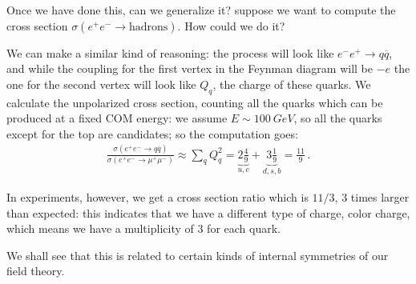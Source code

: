 \documentclass[main.tex]{subfiles}
\begin{document}
Once we have done this, can we generalize it? suppose we want to compute the cross section \(\sigma (e^{+}e^{-} \to \text{hadrons})\). How could we do it?

We can make a similar kind of reasoning: the process will look like \(e^{-} e^{+} \to q \overline{q}\), and while the coupling for the first vertex in the Feynman diagram will be \(-e\) the one for the second vertex will look like \(Q_q\), the charge of these quarks.
We calculate the unpolarized cross section, counting all the quarks which can be produced at a fixed COM energy: we assume \(E \sim \SI{100}{GeV}\), so all the quarks except for the top are candidates; so the computation goes: 
%
\begin{align}
\frac{\sigma (e^{+} e^{-} \to q \overline{q})}{\sigma (e^{+ }e^{-} \to \mu^+ \mu^-)} \approx \sum _{q} Q_q^2 = \underbrace{2 \frac{4}{9} }_{u, c} + \underbrace{3 \frac{1}{9}}_{d, s, b}
= \frac{11}{9}
\,.
\end{align}

In experiments, however, we get a cross section ratio which is \(11/3\), 3 times larger than expected: this indicates that we have a different type of charge, color charge, which means we have a multiplicity of \(3\) for each quark. 

We shall see that this is related to certain kinds of internal symmetries of our field theory. 
\end{document}
